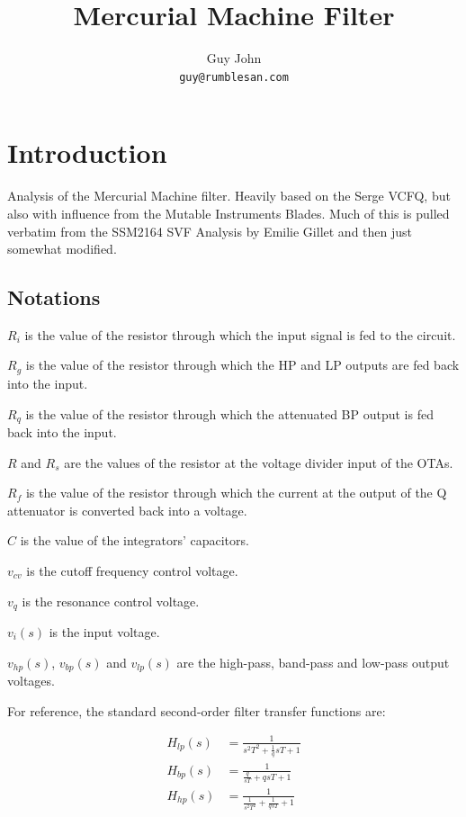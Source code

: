 \documentclass{article}
\title{Mercurial Machine Filter}
\author{Guy John \\ \texttt{guy@rumblesan.com}}
\begin{document}
\maketitle

\section{Introduction}
Analysis of the Mercurial Machine filter. Heavily based on the Serge VCFQ, but also with influence from the Mutable Instruments Blades. Much of this is pulled verbatim from the SSM2164 SVF Analysis by Emilie Gillet and then just somewhat modified.

\newpage

\subsection{Notations}

\begin{description}
\item $R_i$ is the value of the resistor through which the input signal is fed to the circuit.
\item $R_g$ is the value of the resistor through which the HP and LP outputs are fed back into the input.
\item $R_q$ is the value of the resistor through which the attenuated BP output is fed back into the input.
\item $R$ and $R_s$ are the values of the resistor at the voltage divider input of the OTAs.
\item $R_f$ is the value of the resistor through which the current at the output of the Q attenuator is converted back
into a voltage.
\item $C$ is the value of the integrators' capacitors.
\item $v_{cv}$ is the cutoff frequency control voltage.
\item $v_q$ is the resonance control voltage.
\item $v_i(s)$ is the input voltage.
\item $v_{hp}(s)$, $v_{bp}(s)$ and $v_{lp}(s)$ are the high-pass, band-pass and low-pass output voltages.
\end{description}

For reference, the standard second-order filter transfer functions are:

\begin{equation*}
\begin{split}
  H_{lp}(s) & = \frac{1}{s^2T^2 + \frac{1}{q}sT + 1} \\
  H_{bp}(s) & = \frac{1}{\frac{q}{sT} + qsT + 1} \\
  H_{hp}(s) & = \frac{1}{\frac{1}{s^2T^2} + \frac{1}{qsT} + 1} \\
\end{split}
\end{equation*}
\end{document}
